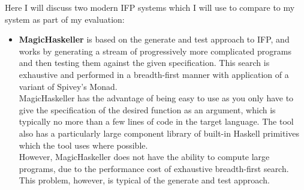 Here I will discuss two modern IFP systems which I will use to compare to my system as part of my evaluation:

\begin{itemize}
\item \textbf{MagicHaskeller} is based on the generate and test approach to IFP, and works by generating a stream of progressively more complicated programs and then testing them against the given specification. This search is exhaustive and performed in a breadth-first manner with application of a variant of Spivey's Monad.\\

MagicHaskeller has the advantage of being easy to use as you only have to give the specification of the desired function as an argument, which is typically no more than a few lines of code in the target language. The tool also has a particularly large component library of built-in Haskell primitives which the tool uses where possible.\\

However, MagicHaskeller does not have the ability to compute large programs, due to the performance cost of exhaustive breadth-first search. This problem, however, is typical of the generate and test approach.


\end{itemize}
